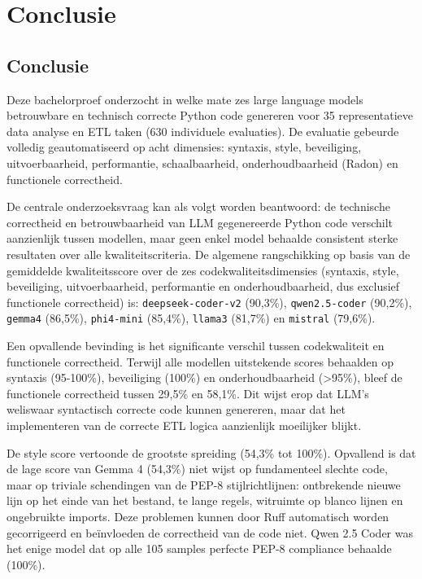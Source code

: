 
\chapter{Conclusie}%
\label{ch:conclusie}

\section{Conclusie}
\label{sec:conclusie}

Deze bachelorproef onderzocht in welke mate zes large language models betrouwbare en technisch correcte Python code genereren voor 35 representatieve data analyse en ETL taken (630 individuele evaluaties). De evaluatie gebeurde volledig geautomatiseerd op acht dimensies: syntaxis, style, beveiliging, uitvoerbaarheid, performantie, schaalbaarheid, onderhoudbaarheid (Radon) en functionele correctheid.

De centrale onderzoeksvraag kan als volgt worden beantwoord: de technische correctheid en betrouwbaarheid van LLM gegenereerde Python code verschilt aanzienlijk tussen modellen, maar geen enkel model behaalde consistent sterke resultaten over alle kwaliteitscriteria. De algemene rangschikking op basis van de gemiddelde kwaliteitsscore over de zes codekwaliteitsdimensies (syntaxis, style, beveiliging, uitvoerbaarheid, performantie en onderhoudbaarheid, dus exclusief functionele correctheid) is: \texttt{deepseek-coder-v2} (90,3\%), \texttt{qwen2.5-coder} (90,2\%), \texttt{gemma4} (86,5\%), \texttt{phi4-mini} (85,4\%), \texttt{llama3} (81,7\%) en \texttt{mistral} (79,6\%).

Een opvallende bevinding is het significante verschil tussen codekwaliteit en functionele correctheid. Terwijl alle modellen uitstekende scores behaalden op syntaxis (95-100\%), beveiliging (100\%) en onderhoudbaarheid (>95\%), bleef de functionele correctheid tussen 29,5\% en 58,1\%. Dit wijst erop dat LLM's weliswaar syntactisch correcte code kunnen genereren, maar dat het implementeren van de correcte ETL logica aanzienlijk moeilijker blijkt.

De style score vertoonde de grootste spreiding (54,3\% tot 100\%). Opvallend is dat de lage score van Gemma 4 (54,3\%) niet wijst op fundamenteel slechte code, maar op triviale schendingen van de PEP-8 stijlrichtlijnen: ontbrekende nieuwe lijn op het einde van het bestand, te lange regels, witruimte op blanco lijnen en ongebruikte imports. Deze problemen kunnen door Ruff automatisch worden gecorrigeerd en beïnvloeden de correctheid van de code niet. Qwen 2.5 Coder was het enige model dat op alle 105 samples perfecte PEP-8 compliance behaalde (100\%).


